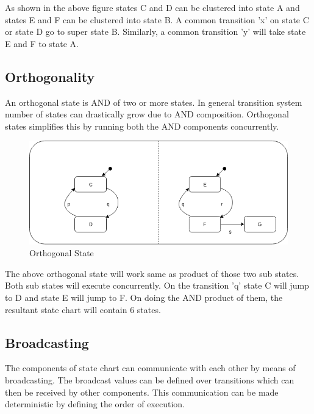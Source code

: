 \documentclass[16pt]{report}
\begin{document}
As shown in the above figure states C and D can be clustered into state A and states E and F can be clustered into state B. A common transition 'x' on state C or state D go to super state B. Similarly, a common transition 'y' will take state E and F to state A.


\subsection{Orthogonality}
An orthogonal state is AND of two or more states. In general transition system number of states can drastically grow due to AND composition. Orthogonal states simplifies this by running both the AND components concurrently.

\begin{figure}[H]
\includegraphics[width=\linewidth]{fig4.png}
\caption{Orthogonal State}
\end{figure}

The above orthogonal state will work same as product of those two sub states. Both sub states will execute concurrently. On the transition 'q' state C will jump to D and state E will jump to F.
On doing the AND product of them, the resultant state chart will contain 6 states.


\subsection{Broadcasting}
The components of state chart can communicate with each other by means of broadcasting. The broadcast values can be defined over transitions which can then be received by other components. This communication can be made deterministic by defining the order of execution.
\end{document}
